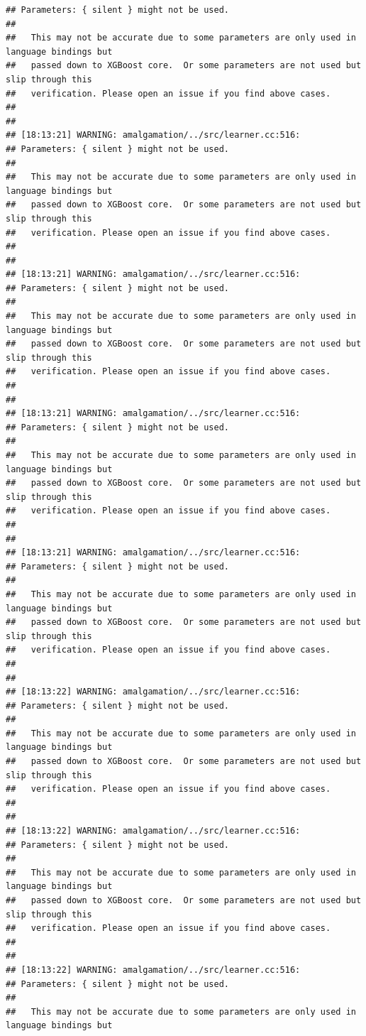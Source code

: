 \documentclass[AMS,STIX2COL]{WileyNJD-v2}\usepackage[]{graphicx}\usepackage[]{color}
\makeatletter
\newenvironment{kframe}{%
 \def\at@end@of@kframe{}%
 \ifinner\ifhmode%
  \def\at@end@of@kframe{\end{minipage}}%
  \begin{minipage}{\columnwidth}%
 \fi\fi%
 \def\FrameCommand##1{\hskip\@totalleftmargin \hskip-\fboxsep
 \colorbox{shadecolor}{##1}\hskip-\fboxsep
     \hskip-\linewidth \hskip-\@totalleftmargin \hskip\columnwidth}%
 \MakeFramed {\advance\hsize-\width
   \@totalleftmargin\z@ \linewidth\hsize
   \@setminipage}}%
 {\par\unskip\endMakeFramed%
 \at@end@of@kframe}
\newenvironment{knitrout}{}{} %
\makeatother
\begin{document}
\begin{knitrout}
\begin{kframe}
\begin{verbatim}
## Parameters: { silent } might not be used.
## 
##   This may not be accurate due to some parameters are only used in language bindings but
##   passed down to XGBoost core.  Or some parameters are not used but slip through this
##   verification. Please open an issue if you find above cases.
## 
## 
## [18:13:21] WARNING: amalgamation/../src/learner.cc:516: 
## Parameters: { silent } might not be used.
## 
##   This may not be accurate due to some parameters are only used in language bindings but
##   passed down to XGBoost core.  Or some parameters are not used but slip through this
##   verification. Please open an issue if you find above cases.
## 
## 
## [18:13:21] WARNING: amalgamation/../src/learner.cc:516: 
## Parameters: { silent } might not be used.
## 
##   This may not be accurate due to some parameters are only used in language bindings but
##   passed down to XGBoost core.  Or some parameters are not used but slip through this
##   verification. Please open an issue if you find above cases.
## 
## 
## [18:13:21] WARNING: amalgamation/../src/learner.cc:516: 
## Parameters: { silent } might not be used.
## 
##   This may not be accurate due to some parameters are only used in language bindings but
##   passed down to XGBoost core.  Or some parameters are not used but slip through this
##   verification. Please open an issue if you find above cases.
## 
## 
## [18:13:21] WARNING: amalgamation/../src/learner.cc:516: 
## Parameters: { silent } might not be used.
## 
##   This may not be accurate due to some parameters are only used in language bindings but
##   passed down to XGBoost core.  Or some parameters are not used but slip through this
##   verification. Please open an issue if you find above cases.
## 
## 
## [18:13:22] WARNING: amalgamation/../src/learner.cc:516: 
## Parameters: { silent } might not be used.
## 
##   This may not be accurate due to some parameters are only used in language bindings but
##   passed down to XGBoost core.  Or some parameters are not used but slip through this
##   verification. Please open an issue if you find above cases.
## 
## 
## [18:13:22] WARNING: amalgamation/../src/learner.cc:516: 
## Parameters: { silent } might not be used.
## 
##   This may not be accurate due to some parameters are only used in language bindings but
##   passed down to XGBoost core.  Or some parameters are not used but slip through this
##   verification. Please open an issue if you find above cases.
## 
## 
## [18:13:22] WARNING: amalgamation/../src/learner.cc:516: 
## Parameters: { silent } might not be used.
## 
##   This may not be accurate due to some parameters are only used in language bindings but

\end{verbatim}
\end{kframe}
\end{knitrout}
\end{document}
